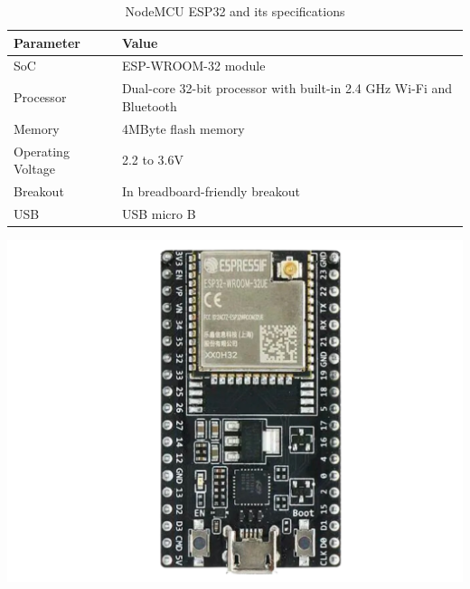 \vspace{2em}

\begin{table}[h]
    \begin{minipage}{0.6\textwidth}
        \centering
        \renewcommand{\arraystretch}{2.0}
        \setlength{\tabcolsep}{4.4pt}
        \footnotesize
        \begin{tabular}{|p{2.9cm}|p{6.4cm}|}
          \hline
          \rowcolor[gray]{0.8} 
          \textbf{Parameter} & \textbf{Value} \\
          \hline
          SoC & ESP-WROOM-32 module \\
          \hline
          Processor & Dual-core 32-bit processor with built-in 2.4 GHz Wi-Fi and Bluetooth \\
          \hline
          Memory & 4MByte flash memory \\
          \hline
          Operating Voltage & 2.2 to 3.6V \\
          \hline
          Breakout & In breadboard-friendly breakout \\
          \hline
          USB & USB micro B \\
          \hline
        \end{tabular}
    \end{minipage}
    \begin{minipage}{0.47\textwidth}
        \centering
        \includegraphics[width=\linewidth, angle=360]{pics/esp32.png}
    \end{minipage}\hfill
    \caption{NodeMCU ESP32 and its specifications}\label{tab:nodemcu}
\end{table}



